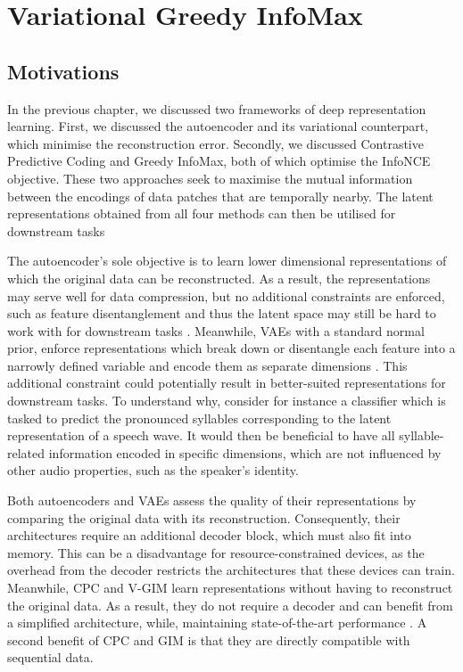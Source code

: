 \chapter{Variational Greedy InfoMax} \label{cha:3}

\section{Motivations} %
	In the previous chapter, we discussed two frameworks of deep representation learning. First, we discussed the autoencoder and its variational counterpart, which minimise the reconstruction error. Secondly, we discussed Contrastive Predictive Coding and Greedy InfoMax, both of which optimise the InfoNCE objective. These two approaches seek to maximise the mutual information between the encodings of data patches that are temporally nearby. The latent representations obtained from all four methods can then be utilised for downstream tasks \citep{bengioRepresentationLearningReview2013a, weiRecentAdvancesVariational2021, oordRepresentationLearningContrastive2019, lowePuttingEndEndtoEnd2020a}
	
		The autoencoder's sole objective is to learn lower dimensional representations of which the original data can be reconstructed. As a result, the representations may serve well for data compression, but no additional constraints are enforced, such as feature disentanglement and thus the latent space may still be hard to work with for downstream tasks \citep{tschannenRecentAdvancesAutoencoderBased2018}. Meanwhile, VAEs with a standard normal prior, enforce representations which break down or disentangle each feature into a narrowly defined variable and encode them as separate dimensions \citep{weiRecentAdvancesVariational2021}. This additional constraint could potentially result in better-suited representations for downstream tasks. To understand why, consider for instance a classifier which is tasked to predict the pronounced syllables corresponding to the latent representation of a speech wave. It would then be beneficial to have all syllable-related information encoded in specific dimensions, which are not influenced by other audio properties, such as the speaker's identity.
	

		Both autoencoders and VAEs assess the quality of their representations by comparing the original data with its reconstruction. Consequently, their architectures require an additional decoder block, which must also fit into memory. This can be a disadvantage for resource-constrained devices, as the overhead from the decoder restricts the architectures that these devices can train. Meanwhile, CPC and V-GIM learn representations without having to reconstruct the original data. As a result, they do not require a decoder and can benefit from a simplified architecture, while, maintaining state-of-the-art performance \citep{stackeEvaluationContrastivePredictive2020}. A second benefit of CPC and GIM is that they are directly compatible with sequential data.
		
